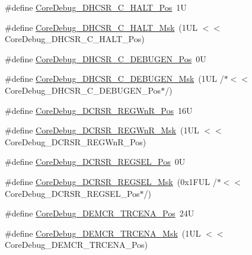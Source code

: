 \begin{DoxyCompactItemize}
\item 
\#define \mbox{\hyperlink{group___c_m_s_i_s___core_debug_gaddf1d43f8857e4efc3dc4e6b15509692}{Core\+Debug\+\_\+\+D\+H\+C\+S\+R\+\_\+\+C\+\_\+\+H\+A\+L\+T\+\_\+\+Pos}}~1U
\item 
\#define \mbox{\hyperlink{group___c_m_s_i_s___core_debug_ga1d905a3aa594eb2e8bb78bcc4da05b3f}{Core\+Debug\+\_\+\+D\+H\+C\+S\+R\+\_\+\+C\+\_\+\+H\+A\+L\+T\+\_\+\+Msk}}~(1\+U\+L $<$$<$ Core\+Debug\+\_\+\+D\+H\+C\+S\+R\+\_\+\+C\+\_\+\+H\+A\+L\+T\+\_\+\+Pos)
\item 
\#define \mbox{\hyperlink{group___c_m_s_i_s___core_debug_gab557abb5b172b74d2cf44efb9d824e4e}{Core\+Debug\+\_\+\+D\+H\+C\+S\+R\+\_\+\+C\+\_\+\+D\+E\+B\+U\+G\+E\+N\+\_\+\+Pos}}~0U
\item 
\#define \mbox{\hyperlink{group___c_m_s_i_s___core_debug_gab815c741a4fc2a61988cd2fb7594210b}{Core\+Debug\+\_\+\+D\+H\+C\+S\+R\+\_\+\+C\+\_\+\+D\+E\+B\+U\+G\+E\+N\+\_\+\+Msk}}~(1\+U\+L /$\ast$$<$$<$ Core\+Debug\+\_\+\+D\+H\+C\+S\+R\+\_\+\+C\+\_\+\+D\+E\+B\+U\+G\+E\+N\+\_\+\+Pos$\ast$/)
\item 
\#define \mbox{\hyperlink{group___c_m_s_i_s___core_debug_ga51e75942fc0614bc9bb2c0e96fcdda9a}{Core\+Debug\+\_\+\+D\+C\+R\+S\+R\+\_\+\+R\+E\+G\+Wn\+R\+\_\+\+Pos}}~16U
\item 
\#define \mbox{\hyperlink{group___c_m_s_i_s___core_debug_ga1eef4992d8f84bc6c0dffed1c87f90a5}{Core\+Debug\+\_\+\+D\+C\+R\+S\+R\+\_\+\+R\+E\+G\+Wn\+R\+\_\+\+Msk}}~(1\+U\+L $<$$<$ Core\+Debug\+\_\+\+D\+C\+R\+S\+R\+\_\+\+R\+E\+G\+Wn\+R\+\_\+\+Pos)
\item 
\#define \mbox{\hyperlink{group___c_m_s_i_s___core_debug_ga52182c8a9f63a52470244c0bc2064f7b}{Core\+Debug\+\_\+\+D\+C\+R\+S\+R\+\_\+\+R\+E\+G\+S\+E\+L\+\_\+\+Pos}}~0U
\item 
\#define \mbox{\hyperlink{group___c_m_s_i_s___core_debug_ga17cafbd72b55030219ce5609baa7c01d}{Core\+Debug\+\_\+\+D\+C\+R\+S\+R\+\_\+\+R\+E\+G\+S\+E\+L\+\_\+\+Msk}}~(0x1\+F\+U\+L /$\ast$$<$$<$ Core\+Debug\+\_\+\+D\+C\+R\+S\+R\+\_\+\+R\+E\+G\+S\+E\+L\+\_\+\+Pos$\ast$/)
\item 
\#define \mbox{\hyperlink{group___c_m_s_i_s___core_debug_ga6ff2102b98f86540224819a1b767ba39}{Core\+Debug\+\_\+\+D\+E\+M\+C\+R\+\_\+\+T\+R\+C\+E\+N\+A\+\_\+\+Pos}}~24U
\item 
\#define \mbox{\hyperlink{group___c_m_s_i_s___core_debug_ga5e99652c1df93b441257389f49407834}{Core\+Debug\+\_\+\+D\+E\+M\+C\+R\+\_\+\+T\+R\+C\+E\+N\+A\+\_\+\+Msk}}~(1\+U\+L $<$$<$ Core\+Debug\+\_\+\+D\+E\+M\+C\+R\+\_\+\+T\+R\+C\+E\+N\+A\+\_\+\+Pos)
$$
\end{DoxyCompactItemize}
